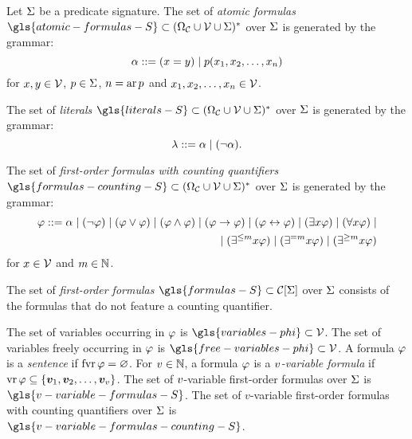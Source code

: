 
Let $\mathrm{\Sigma}$ be a predicate signature.
The set of \emph{atomic formulas} $\gls{atomic-formulas-S} \subset
\Words{(\SymbAlph \cup \VarSymbs \cup \SigS)}$ over $\mathrm{\Sigma}$ is generated by the
grammar:
\[
  \alpha ::= (x = y) \mid p(x_{1}, x_{2}, \dots, x_{n})
\]
for $x,y \in \mathcal{V}$, $p \in \mathrm{\Sigma}$, $n = \operatorname{ar}p$ and
$x_{1}, x_{2}, \dots, x_{n} \in \mathcal{V}$.

The set of \emph{literals} 
$\gls{literals-S} \subset \Words{(\SymbAlph \cup \VarSymbs \cup \SigS)}$ over
$\mathrm{\Sigma}$ is generated by the grammar:
\[
  \lambda ::= \alpha \mid (\lnot\alpha).
\]

The set of \emph{first-order formulas with counting quantifiers}
$\gls{formulas-counting-S} \subset \Words{(\SymbAlph \cup \VarSymbs \cup
\SigS)}$ over $\mathrm{\Sigma}$ is generated by the grammar:
\begin{align*}
  \varphi ::= \alpha \mid (\lnot\varphi) \mid (\varphi \lor \varphi)
  \mid (\varphi \land \varphi) \mid (\varphi \rightarrow \varphi) 
  \mid (\varphi \leftrightarrow \varphi) 
  \mid (\exists x\varphi) \mid (\forall x\varphi) \mid \\
  \mid (\exists^{\leq m}x\varphi)
  \mid (\exists^{=m}x\varphi)
  \mid (\exists^{\geq m}x\varphi)
\end{align*}
for $x \in \mathcal{V}$ and $m \in \mathbb{N}$.

The set of \emph{first-order formulas} $\gls{formulas-S} \subset \FocF\SigS$
over $\mathrm{\Sigma}$ consists of the formulas that do not feature a counting quantifier.

The set of variables occurring in $\varphi$ is $\gls{variables-phi} \subset
\VarSymbs$.
The set of variables freely occurring in $\varphi$ is $\gls{free-variables-phi}
\subset \VarSymbs$. A formula $\varphi$ is a \emph{sentence} if $\operatorname{fvr}\varphi =
\varnothing$. For $v \in \mathbb{N}$, a formula $\varphi$ is a \emph{$v$-variable
formula} if $\operatorname{vr}\varphi \subseteq \left\{\bm{v}_{1},\bm{v}_{2},\dots,\bm{v}_{v}\right\}$.
The set of $v$-variable first-order formulas over $\mathrm{\Sigma}$ is
$\gls{v-variable-formulas-S}$.
The set of $v$-variable first-order formulas with counting quantifiers over
$\mathrm{\Sigma}$ is $\gls{v-variable-formulas-counting-S}$.